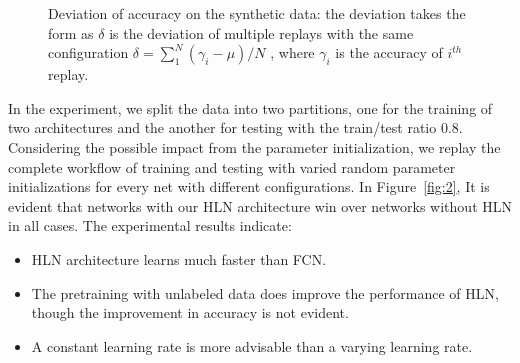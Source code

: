 \documentclass[3p,times,procedia]{elsarticle}
\begin{document}
\begin{figure}[h]
	\centering
	\hspace{-8mm}
	\hspace{-8mm}
	\caption{
		Deviation of
		accuracy on the synthetic data:
		the deviation takes the form as
		$\delta$ is the deviation of
		multiple replays with the same
		configuration 
		$\delta=\sum_1^N(\gamma_i-\mu)/N$
		, where $\gamma_i$ is the
		accuracy of $i^{th}$ replay.
		}
	\label{fig:3}
\end{figure}

In the experiment,
we split the data into two partitions, 
one for the training of two
architectures and the another for
testing with the train/test ratio 0.8.
Considering the possible impact from
the parameter initialization,
we replay the complete workflow
of training and testing with varied
random parameter initializations
for every net with different 
configurations.
In Figure~\ref{fig:2}, It is evident
that networks with our HLN 
architecture win over networks without 
HLN in all cases.
The experimental results indicate:
\begin{itemize}
	\item HLN architecture 
		learns much faster than
		FCN.
	\item The pretraining
		with unlabeled data does improve 
		the performance of HLN, though 
		the improvement in accuracy
		is not evident.
	\item A constant learning rate is
		more advisable than a varying
		learning rate.
\end{itemize}
\end{document}
